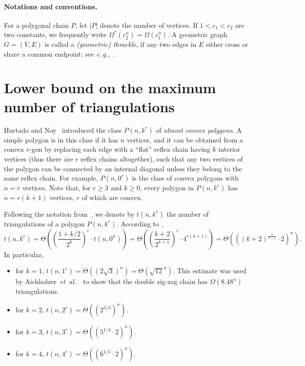 \documentclass[11pt]{article}
\def\etal{{\it et~al.}\,}
\def\eg{{\it e.\,g.},~}
\begin{document}
\paragraph{Notations and conventions.}
For a polygonal chain $P$, let $|P|$ denote the number of vertices.
If $1<c_1<c_2$ are two constants, we frequently write
$\Omega^*(c_2^n) = \Omega(c_1^n)$.
A geometric graph $G=(V,E)$ is called a {\em (geometric) thrackle}, if any two
edges in $E$ either cross or share a common endpoint; see \eg\cite{PA95}.


\section {Lower bound on the maximum number of triangulations}
\label{sec:tri}

Hurtado and Noy~\cite{HN97} introduced the class $P(n,k^r)$ of
{\em almost convex polygons}. A simple polygon is in this class
if it has $n$ vertices, and it can be obtained from a convex $r$-gon
by replacing each edge with a ``flat'' reflex chain having $k$
interior vertices (thus there are $r$ reflex chains altogether), such
that any two vertices of the polygon can be connected by an internal
diagonal unless they belong to the same reflex chain.
For example, $P(n,0^r)$ is the class of convex polygons with $n=r$ vertices.
Note that, for $r \geq 3$ and $k \geq 0$, every polygon in $P(n,k^r)$ has
$n=r(k+1)$ vertices, $r$ of which are convex.

Following the notation from~\cite{HN97}, we denote by $t(n,k^r)$
the number of triangulations of a polygon $P(n,k^r)$. According to
\cite[Theorem 3]{HN97},
\begin{equation*} \label{E6}
t(n,k^r) =\Theta\left(\left(\frac{1+k/2}{2^k}\right)^r \cdot t(n,0^n)\right) =
\Theta\left(\left( \frac{k+2}{2^{k+1}}\right)^r \cdot 4^{r(k+1)}\right)=
\Theta\left(\left( (k+2)^{\frac{1}{k+1}} \cdot 2 \right)^n\right).
\end{equation*}
In particular,
\begin{itemize}
\item for $k=1$, $t(n,1^r) = \Theta( (2 \sqrt{3})^n)=\Theta(\sqrt{12}^n)$.
This estimate was used by Aichholzer~\etal~\cite{AHV+06} to show that
the double zig-zag chain has $\Omega(8.48^n)$ triangulations. 
\item for $k=2$, $t(n,2^r) = \Theta((2^{5/3})^n)$.
\item for $k=3$, $t(n,3^r) = \Theta((5^{1/4} \cdot 2)^n)$.
\item for $k=4$, $t(n,4^r) = \Theta((6^{1/5} \cdot 2)^n)$.
\end{itemize}
\end{document}
